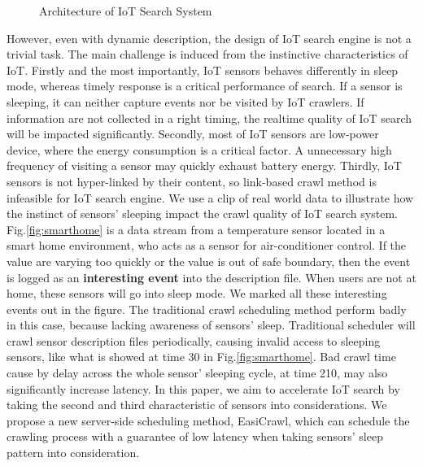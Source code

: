 \documentclass[conference]{IEEEtran}
\begin{document}
\begin{figure}
	\vspace{0.5em}
	\centering
	\hspace{-3.0em}
	
	\captionsetup{justification=centering}
	\caption{Architecture of IoT Search System}
	\vspace{-1.0em}
	\label{fig:architecture}
\end{figure}

However, even with dynamic description, the design of IoT search engine is not a trivial task. The main challenge is induced from the instinctive characteristics of IoT. 
Firstly and the most importantly, IoT sensors behaves differently in sleep mode, whereas timely response is a critical performance of search. If a sensor is sleeping, it can neither capture events nor be visited by IoT crawlers. If information are not collected in a right timing, the realtime quality of IoT search will be impacted significantly.
Secondly, most of IoT sensors are low-power device, where the energy consumption is a critical factor. A unnecessary high frequency of visiting a sensor may quickly exhaust battery energy.
Thirdly, IoT sensors is not hyper-linked by their content, so link-based crawl method is infeasible for IoT search engine. 
We use a clip of real world data to illustrate how the instinct of sensors' sleeping impact the crawl quality of IoT search system.
Fig.\ref{fig:smarthome} is a data stream from a temperature sensor located in a smart home environment, who acts as a sensor for air-conditioner control. 
If the value are varying too quickly or the value is out of safe boundary, then the event is logged as an \textbf{interesting event} into the description file.
When users are not at home, these sensors will go into sleep mode. 
We marked all these interesting events out in the figure.
The traditional crawl scheduling method perform badly in this case, because lacking awareness of sensors' sleep. Traditional scheduler will crawl sensor description files periodically, causing invalid access to sleeping sensors, like what is showed at time 30 in Fig.\ref{fig:smarthome}. Bad crawl time cause by delay across the whole sensor' sleeping cycle, at time 210, may also significantly increase latency. 
In this paper, we aim to accelerate IoT search by taking the second and third characteristic of sensors into considerations.
We propose a new server-side scheduling method, EasiCrawl, which can schedule the crawling process with a guarantee of low latency when taking sensors' sleep pattern into consideration.
\end{document}

